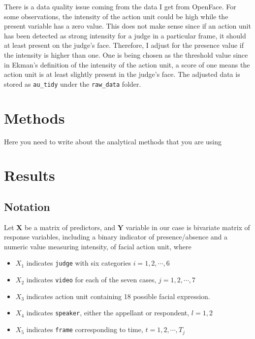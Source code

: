 \documentclass{monashthesis}
\begin{document}
There is a data quality issue coming from the data I get from OpenFace. For some observations, the intensity of the action unit could be high while the present variable has a zero value. This does not make sense since if an action unit has been detected as strong intensity for a judge in a particular frame, it should at least present on the judge's face. Therefore, I adjust for the presence value if the intensity is higher than one. One is being chosen as the threshold value since in Ekman's definition of the intensity of the action unit, a score of one means the action unit is at least slightly present in the judge's face. The adjusted data is stored as \texttt{au\_tidy} under the \texttt{raw\_data} folder.

\hypertarget{methods}{%
\chapter{Methods}\label{methods}}

Here you need to write about the analytical methods that you are using

\hypertarget{results}{%
\chapter{Results}\label{results}}

\hypertarget{notation}{%
\section{Notation}\label{notation}}

Let \(\mathbf{X}\) be a matrix of predictors, and \(\mathbf{Y}\) variable in our case is bivariate matrix of response variables, including a binary indicator of presence/absence and a numeric value measuring intensity, of facial action unit, where

\begin{itemize}
\tightlist
\item
  \(X_1\) indicates \texttt{judge} with six categories \(i = 1,2, \cdots, 6\)
\item
  \(X_2\) indicates \texttt{video} for each of the seven cases, \(j = 1,2, \cdots, 7\)
\item
  \(X_3\) indicates action unit containing 18 possible facial expression.\\
\item
  \(X_4\) indicates \texttt{speaker}, either the appellant or respondent, \(l=1,2\)
\item
  \(X_5\) indicates \texttt{frame} corresponding to time, \(t = 1,2, \cdots, T_j\)
\end{itemize}
\end{document}
